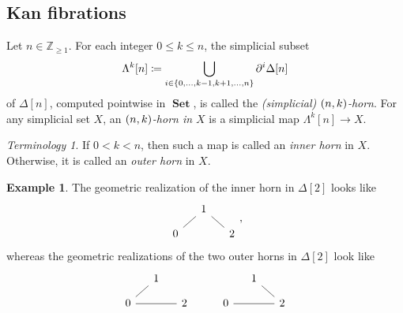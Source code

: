 \documentclass[10pt,letterpaper,cm]{nupset}
\theoremstyle{definition}
\newtheorem{exmp}[definition]{Example}
\theoremstyle{theorem}
\theoremstyle{remark}
\newtheorem*{term}{Terminology}
\newcommand{\Z}{\mathbb Z}
\newcommand{\0}{\mathbf{0}}
\newcommand{\1}{\mathbf{1}}
\newcommand{\2}{\mathbf{2}}
\DeclareMathOperator{\sset}{\mathbf{sSet}}
\DeclareMathOperator{\set}{\mathbf{Set}}
\newcommand{\bi}{\begin{itemize}}
\newcommand{\ei}{\end{itemize}}
\begin{document}
\subsection*{Kan fibrations}

Let $n\in \Z_{\geq 1}$. For each integer $0\leq k\leq n$, the simplicial subset
\[
\Lambda^k[n]\coloneqq \bigcup_{i\in \mleft\{0,\ldots, k-1, k+1, \ldots, n\mright\}}\partial^i{\Delta[n]}
\] of $\Delta[n]$, computed pointwise in $\set$,  is called the \textit{(simplicial) $\mleft(n,k\mright)$-horn}. For any simplicial set $X$, an \textit{$\mleft(n,k\mright)$-horn in $X$} is a simplicial map $\Lambda^k[n] \to X$. 
\begin{term}
If $0<k<n$, then such a map is called an \textit{inner horn} in $X$. Otherwise, it is called an \textit{outer horn} in $X$.
\end{term}

\begin{exmp}
The geometric realization of the inner horn in $\Delta[2]$ looks like
\[
\begin{tikzcd}[column sep=small, row sep=small]
             & 1 \arrow[rd, no head] &   \\
0 \arrow[ru, no head] &              & 2
\end{tikzcd},
\]
 whereas  the geometric realizations of the two outer horns in $\Delta[2]$ look like
 \[
\begin{tikzcd}[column sep=small, row sep=small]
                        & 1 &   &  &              & 1 \arrow[rd, no head] &   \\
0 \arrow[ru, no head] \arrow[rr, no head] &   & 2 &  & 0 \arrow[rr, no head] &              & 2
\end{tikzcd}
 \]
\end{exmp}

\smallskip

\begin{comment}
\medskip

Now is a good time to list a couple more discrete-geometric objects in $\sset$. Let $m\in \Z_{\geq 1}$.

\bi
\item A \textit{prism of dimension $m+n$} is the cartesian product $\Delta[m,n]\coloneqq \Delta[m]\times \Delta[n]$.

The \textit{boundary} of this simplicial set is given by the Leibniz rule:
\[
\partial{\Delta[m+n]} \coloneqq \mleft(\partial{\Delta[m]} \times \Delta[n]\mright)\cup \mleft(\Delta[m]\times \partial{\Delta[n]}\mright)
.\] 
\item By removing the face $\Delta[m]\times \partial^k{\Delta[n]}$ from $\partial{\Delta[m+n]}$, we obtain an \textit{open box}
\[
\Lambda^{m+1+k}[m,n]\coloneqq \mleft(\partial{\Delta[m]}\times \Delta[n]\mright) \cup \mleft(\Delta[m] \times \Lambda^k[n]\mright).
\]
\ei

\medskip
\end{comment}
\end{document}
